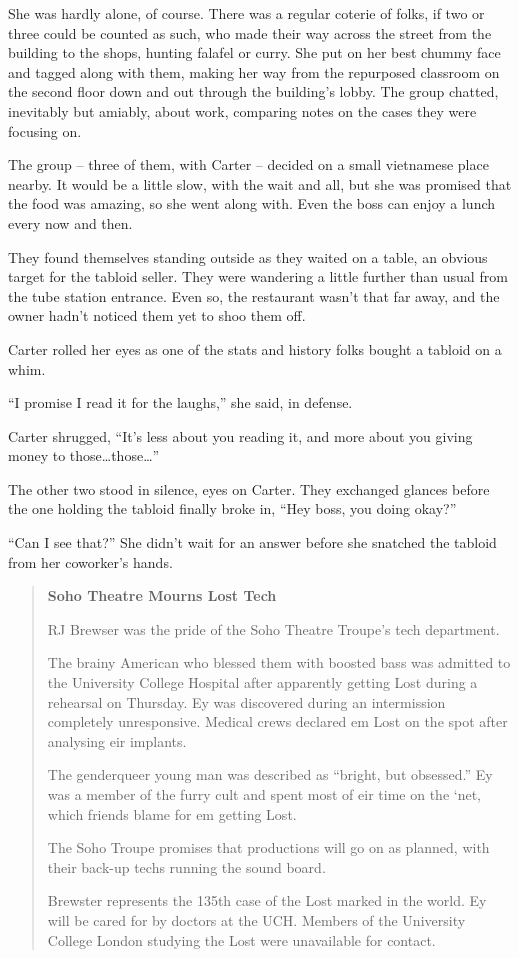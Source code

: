 She was hardly alone, of course. There was a regular coterie of folks, if two or three could be counted as such, who made their way across the street from the building to the shops, hunting falafel or curry. She put on her best chummy face and tagged along with them, making her way from the repurposed classroom on the second floor down and out through the building's lobby. The group chatted, inevitably but amiably, about work, comparing notes on the cases they were focusing on.

The group -- three of them, with Carter -- decided on a small vietnamese place nearby. It would be a little slow, with the wait and all, but she was promised that the food was amazing, so she went along with. Even the boss can enjoy a lunch every now and then.

They found themselves standing outside as they waited on a table, an obvious target for the tabloid seller. They were wandering a little further than usual from the tube station entrance. Even so, the restaurant wasn't that far away, and the owner hadn't noticed them yet to shoo them off.

Carter rolled her eyes as one of the stats and history folks bought a tabloid on a whim.

``I promise I read it for the laughs,'' she said, in defense.

Carter shrugged, ``It's less about you reading it, and more about you giving money to those\ldots{}those\ldots{}''

The other two stood in silence, eyes on Carter. They exchanged glances before the one holding the tabloid finally broke in, ``Hey boss, you doing okay?''

``Can I see that?'' She didn't wait for an answer before she snatched the tabloid from her coworker's hands.

\begin{quotation}
  \textbf{Soho Theatre Mourns Lost Tech}

  RJ Brewser was the pride of the Soho Theatre Troupe's tech department.

  The brainy American who blessed them with boosted bass was admitted to the University College Hospital after apparently getting Lost during a rehearsal on Thursday. Ey was discovered during an intermission completely unresponsive. Medical crews declared em Lost on the spot after analysing eir implants.

  The genderqueer young man was described as ``bright, but obsessed.'' Ey was a member of the furry cult and spent most of eir time on the `net, which friends blame for em getting Lost.

  The Soho Troupe promises that productions will go on as planned, with their back-up techs running the sound board.

  Brewster represents the 135th case of the Lost marked in the world. Ey will be cared for by doctors at the UCH. Members of the University College London studying the Lost were unavailable for contact.
\end{quotation}

